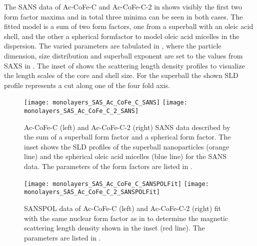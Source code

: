 \documentclass[\main/dresen_thesis.tex]{subfiles}
\begin{document}
    The SANS data of Ac-CoFe-C and Ac-CoFe-C-2 in  shows visibly the first two form factor maxima and in total three minima can be seen in both cases.
    The fitted model is a sum of two form factors, one from a superball with an oleic acid shell, and the other a spherical formfactor to model oleic acid micelles in the dispersion.
    The varied parameters are tabulated in , where the particle dimension, size distribution and superball exponent are set to the values from SAXS in .
    The inset of  shows the scattering length density profiles to visualize the length scales of the core and shell size.
    For the superball the shown SLD profile represents a cut along one of the four fold axis.

    \begin{figure}[!htbp]
      \centering
      \texttt{[image: monolayers\_SAS\_Ac\_CoFe\_C\_SANS]}
      \texttt{[image: monolayers\_SAS\_Ac\_CoFe\_C\_2\_SANS]}
      \caption{\label{fig:monolayers:nanoparticle:sans:superballAcAcFit}Ac-CoFe-C (left) and Ac-CoFe-C-2 (right) SANS data described by the sum of a superball form factor and a spherical form factor. The inset shows the SLD profiles of the superball nanoparticles (orange line) and the spherical oleic acid micelles (blue line) for the SANS data. The parameters of the form factors are listed in .}
    \end{figure}

    \begin{figure}[!htbp]
      \centering
      \texttt{[image: monolayers\_SAS\_Ac\_CoFe\_C\_SANSPOLFit]}
      \texttt{[image: monolayers\_SAS\_Ac\_CoFe\_C\_2\_SANSPOLFit]}
      \caption{\label{fig:monolayers:nanoparticle:sanspol:superballAcAcFit}SANSPOL data of Ac-CoFe-C (left) and Ac-CoFe-C-2 (right) fit with the same nuclear form factor as in  to determine the magnetic scattering length density  shown in the inset (red line). The parameters are listed in .}
    \end{figure}
\end{document}
